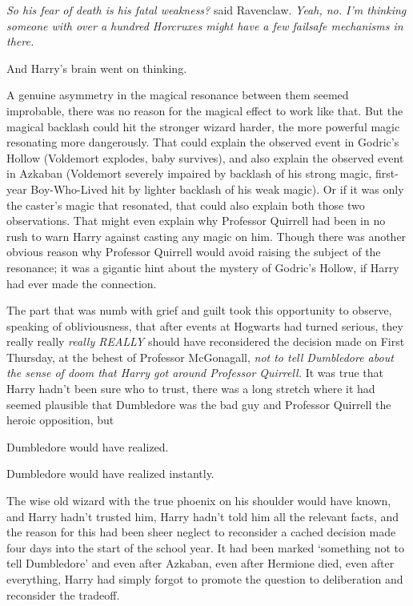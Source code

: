 \emph{So his fear of death is his fatal weakness?} said Ravenclaw. \emph{Yeah,
no. I'm thinking someone with over a hundred Horcruxes might have a few
failsafe mechanisms in there.}

And Harry's brain went on thinking.

A genuine asymmetry in the magical resonance between them{\el} seemed
improbable, there was no reason for the magical effect to work like that. But
the magical backlash could hit the stronger wizard harder, the more powerful
magic resonating more dangerously. That could explain the observed event in
Godric's Hollow (Voldemort explodes, baby survives), and also explain the
observed event in Azkaban (Voldemort severely impaired by backlash of his
strong magic, first-year Boy-Who-Lived hit by lighter backlash of his weak
magic). Or if it was only the caster's magic that resonated, that could also
explain both those two observations. That might even explain why Professor
Quirrell had been in no rush to warn Harry against casting any magic on him.
Though there was another obvious reason why Professor Quirrell would avoid
raising the subject of the resonance; it was a gigantic hint about the mystery
of Godric's Hollow, if Harry had ever made the connection.

The part that was numb with grief and guilt took this opportunity to observe,
speaking of obliviousness, that after events at Hogwarts had turned serious,
they really really \emph{really REALLY} should have reconsidered the decision
made on First Thursday, at the behest of Professor McGonagall, \emph{not to
tell Dumbledore about the sense of doom that Harry got around Professor
Quirrell.} It was true that Harry hadn't been sure who to trust, there was a
long stretch where it had seemed plausible that Dumbledore was the bad guy and
Professor Quirrell the heroic opposition, but{\el}

Dumbledore would have realized.

Dumbledore would have realized instantly.

The wise old wizard with the true phoenix on his shoulder would have known, and
Harry hadn't trusted him, Harry hadn't told him all the relevant facts, and the
reason for this had been sheer neglect to reconsider a cached decision made
four days into the start of the school year. It had been marked `something not
to tell Dumbledore' and even after Azkaban, even after Hermione died, even
after everything, Harry had simply forgot to promote the question to
deliberation and reconsider the tradeoff.


